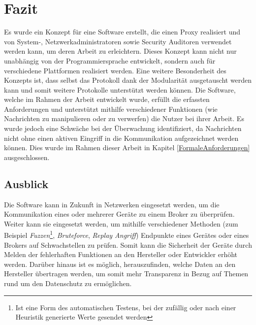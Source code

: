 \chapter{Fazit}
Es wurde ein Konzept für eine Software erstellt, die einen Proxy realisiert und von System-, Netzwerkadministratoren sowie Security Auditoren verwendet werden kann, um deren Arbeit zu erleichtern. Dieses Konzept kann nicht nur unabhängig von der Programmiersprache entwickelt, sondern auch für verschiedene Plattformen realisiert werden. Eine weitere Besonderheit des Konzepts ist, dass selbst das Protokoll dank der Modularität ausgetauscht werden kann und somit weitere Protokolle unterstützt werden können.
Die Software, welche im Rahmen der Arbeit entwickelt wurde, erfüllt die erfassten Anforderungen und unterstützt mithilfe verschiedener Funktionen (wie Nachrichten zu manipulieren oder zu verwerfen) die Nutzer bei ihrer Arbeit. Es wurde jedoch eine Schwäche bei der Überwachung identifiziert, da Nachrichten nicht ohne einen aktiven Eingriff in die Kommunikation aufgezeichnet werden können. Dies wurde im Rahmen dieser Arbeit in Kapitel \ref{FormaleAnforderungen} ausgeschlossen.


\section{Ausblick}
Die Software kann in Zukunft in Netzwerken eingesetzt werden, um die Kommunikation eines oder mehrerer Geräte zu einem Broker zu überprüfen.
Weiter kann sie eingesetzt werden, um mithilfe verschiedener Methoden (zum Beispiel \emph{Fuzzen}\footnote{Ist eine Form des automatischen Testens, bei der zufällig oder nach einer Heuristik generierte Werte gesendet werden}, \emph{Bruteforce}, \emph{Replay Angriff}) Endpunkte eines Gerätes oder eines Brokers auf Schwachstellen zu prüfen. Somit kann die Sicherheit der Geräte durch Melden der fehlerhaften Funktionen an den Hersteller oder Entwickler erhöht werden. Darüber hinaus ist es möglich, herauszufinden, welche Daten an den Hersteller übertragen werden, um somit mehr Transparenz in Bezug auf Themen rund um den Datenschutz zu ermöglichen.

